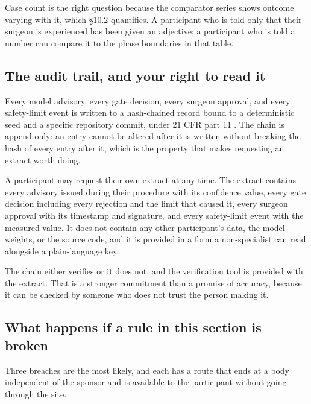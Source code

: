 Case count is the right question because the comparator series shows outcome
varying with it, which \S 10.2 quantifies. A participant who is told only that
their surgeon is experienced has been given an adjective; a participant who is
told a number can compare it to the phase boundaries in that table.

\subsection{The audit trail, and your right to read it}

Every model advisory, every gate decision, every surgeon approval, and every
safety-limit event is written to a hash-chained record bound to a deterministic
seed and a specific repository commit, under 21 CFR part 11
\cite{ecfr2026part11, cfr312paiuni}. The chain is append-only: an entry cannot
be altered after it is written without breaking the hash of every entry after
it, which is the property that makes requesting an extract worth doing.

A participant may request their own extract at any time. The extract contains
every advisory issued during their procedure with its confidence value, every
gate decision including every rejection and the limit that caused it, every
surgeon approval with its timestamp and signature, and every safety-limit event
with the measured value. It does not contain any other participant's data, the
model weights, or the source code, and it is provided in a form a
non-specialist can read alongside a plain-language key.

The chain either verifies or it does not, and the verification tool is provided
with the extract. That is a stronger commitment than a promise of accuracy,
because it can be checked by someone who does not trust the person making it.

\subsection{What happens if a rule in this section is broken}

Three breaches are the most likely, and each has a route that ends at a body
independent of the sponsor and is available to the participant without going
through the site.

\vspace{0.30em}

